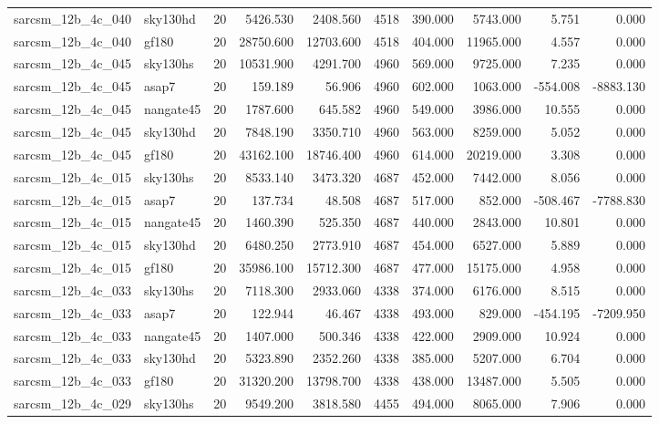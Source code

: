 \documentclass{article}
\begin{document}
\begin{longtable}{llrrrrrrrr}
sarcsm\_12b\_4c\_040 & sky130hd & 20 & 5426.530 & 2408.560 & 4518 & 390.000 & 5743.000 & 5.751 & 0.000 \\
sarcsm\_12b\_4c\_040 & gf180 & 20 & 28750.600 & 12703.600 & 4518 & 404.000 & 11965.000 & 4.557 & 0.000 \\
sarcsm\_12b\_4c\_045 & sky130hs & 20 & 10531.900 & 4291.700 & 4960 & 569.000 & 9725.000 & 7.235 & 0.000 \\
sarcsm\_12b\_4c\_045 & asap7 & 20 & 159.189 & 56.906 & 4960 & 602.000 & 1063.000 & -554.008 & -8883.130 \\
sarcsm\_12b\_4c\_045 & nangate45 & 20 & 1787.600 & 645.582 & 4960 & 549.000 & 3986.000 & 10.555 & 0.000 \\
sarcsm\_12b\_4c\_045 & sky130hd & 20 & 7848.190 & 3350.710 & 4960 & 563.000 & 8259.000 & 5.052 & 0.000 \\
sarcsm\_12b\_4c\_045 & gf180 & 20 & 43162.100 & 18746.400 & 4960 & 614.000 & 20219.000 & 3.308 & 0.000 \\
sarcsm\_12b\_4c\_015 & sky130hs & 20 & 8533.140 & 3473.320 & 4687 & 452.000 & 7442.000 & 8.056 & 0.000 \\
sarcsm\_12b\_4c\_015 & asap7 & 20 & 137.734 & 48.508 & 4687 & 517.000 & 852.000 & -508.467 & -7788.830 \\
sarcsm\_12b\_4c\_015 & nangate45 & 20 & 1460.390 & 525.350 & 4687 & 440.000 & 2843.000 & 10.801 & 0.000 \\
sarcsm\_12b\_4c\_015 & sky130hd & 20 & 6480.250 & 2773.910 & 4687 & 454.000 & 6527.000 & 5.889 & 0.000 \\
sarcsm\_12b\_4c\_015 & gf180 & 20 & 35986.100 & 15712.300 & 4687 & 477.000 & 15175.000 & 4.958 & 0.000 \\
sarcsm\_12b\_4c\_033 & sky130hs & 20 & 7118.300 & 2933.060 & 4338 & 374.000 & 6176.000 & 8.515 & 0.000 \\
sarcsm\_12b\_4c\_033 & asap7 & 20 & 122.944 & 46.467 & 4338 & 493.000 & 829.000 & -454.195 & -7209.950 \\
sarcsm\_12b\_4c\_033 & nangate45 & 20 & 1407.000 & 500.346 & 4338 & 422.000 & 2909.000 & 10.924 & 0.000 \\
sarcsm\_12b\_4c\_033 & sky130hd & 20 & 5323.890 & 2352.260 & 4338 & 385.000 & 5207.000 & 6.704 & 0.000 \\
sarcsm\_12b\_4c\_033 & gf180 & 20 & 31320.200 & 13798.700 & 4338 & 438.000 & 13487.000 & 5.505 & 0.000 \\
sarcsm\_12b\_4c\_029 & sky130hs & 20 & 9549.200 & 3818.580 & 4455 & 494.000 & 8065.000 & 7.906 & 0.000 \\

\end{longtable}
\end{document}
